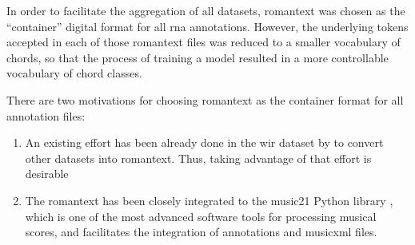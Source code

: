 
In order to facilitate the aggregation of all datasets,
\gls{romantext} was chosen as the ``container'' digital
format for all \gls{rna} annotations. However, the
underlying tokens accepted in each of those \gls{romantext}
files was reduced to a smaller vocabulary of chords, so that
the process of training a model resulted in a more
controllable vocabulary of chord classes.

There are two motivations for choosing \gls{romantext} as
the container format for all annotation files:

\begin{enumerate}
    \item An existing effort has been already done in the
    \gls{wir} dataset by \textcite{gotham2019romantext,
    gotham2022openscore} to convert other datasets into
    \gls{romantext}. Thus, taking advantage of that effort
    is desirable
    \item The \gls{romantext} has been closely integrated to
    the music21 Python library
    \parencite{cuthbert2010music21}, which is one of the
    most advanced software tools for processing musical
    scores, and facilitates the integration of annotations
    and \gls{musicxml} files.
\end{enumerate}